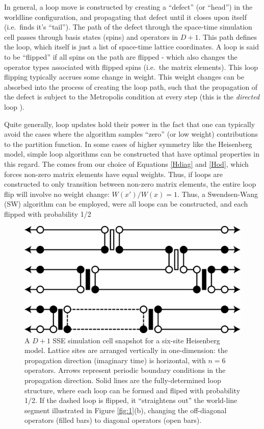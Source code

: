 \documentclass[vecphys]{svmult}
\begin{document}
In general, a loop move is constructed by creating a ``defect'' (or ``head'') in the worldline configuration, and propagating that defect until it closes upon itself (i.e.~finds it's ``tail'').  The path of the defect through the space-time simulation cell passes through basis states (spins) and operators in $D+1$.  This path defines the loop, which itself is just a list of space-time lattice coordinates.  A loop is said to be ``flipped'' if all spins on the path are flipped - which also changes the operator types associated with flipped spins (i.e.~the matrix elements).
This loop flipping typically accrues some change in weight.  This weight changes can be absorbed into the process of creating the loop path, such that the propagation of the defect is subject to the Metropolis condition at every step (this is the {\em directed} loop \cite{Melko:Syljuasen02}).  

Quite generally, loop updates hold their power in the fact that one can typically avoid the cases where the algorithm samples ``zero'' (or low weight) contributions to the partition function.  In some cases of higher symmetry like the Heisenberg model, simple loop algorithms can be constructed that have optimal properties in this regard.  The comes from our choice of Equations \ref{Hdiag} and \ref{Hod}, which forces non-zero matrix elements have equal weights.  Thus, if loops are constructed to only transition between non-zero matrix elements, the entire loop flip will involve no weight change: $W(x')/W(x) = 1$.  Thus, a Swendsen-Wang (SW) algorithm can be employed, were
all loops can be constructed, and each flipped with probability 1/2 \cite{Melko:Swendsen88}

\begin{figure}[t]
\centering
\includegraphics*[width=.9\textwidth]{finiteT_heis.eps}
\caption[]{A $D+1$ SSE simulation cell snapshot for a six-site Heisenberg model.  Lattice sites are arranged vertically in one-dimension: the propagation direction (imaginary time) is horizontal, with $n=6$ operators.  Arrows represent periodic boundary conditions in the propagation direction.  Solid lines are the fully-determined loop structure, where each loop can be formed and fliped with probability 1/2.  If the dashed loop is flipped, it ``straightens out'' the world-line segment illustrated in Figure \ref{fig:1}(b), changing the off-diagonal operators (filled bars) to diagonal operators (open bars).}
\label{fig:2}       %
\end{figure} 
\end{document}
